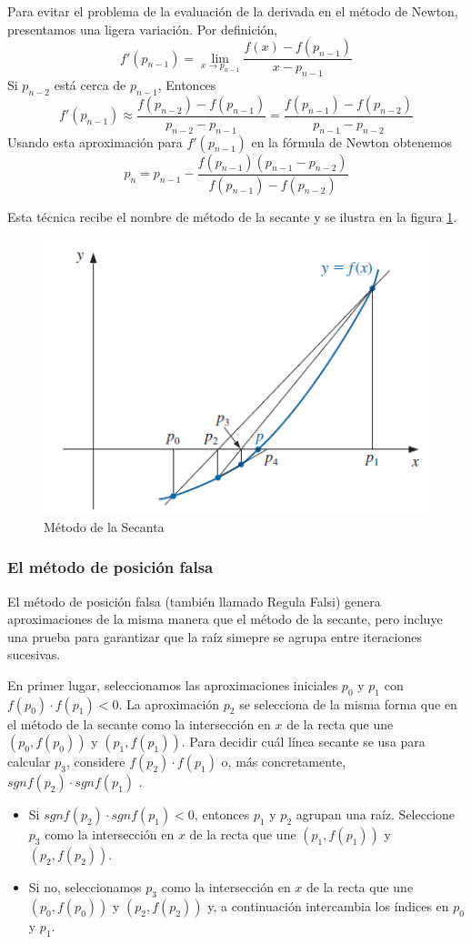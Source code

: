 Para evitar el problema de la evaluación de la derivada en el método de Newton, presentamos una ligera variación. Por definición,
\[ f'(p_{n - 1}) = \lim_{x \rightarrow p_{n - 1}} \frac{f(x) - f(p_{n  - 1})}{x - p_{n  - 1}} \]
Si $p_{n - 2}$ está cerca de $p_{n - 1}$, Entonces
\[ f'(p_{n - 1}) \approx \frac{f(p_{n - 2}) - f(p_{n - 1})}{p_{n - 2} - p_{n - 1}} = \frac{f(p_{n - 1}) - f(p_{n - 2})}{p_{n - 1} - p_{n - 2}}\]
Usando esta aproximación para $f'(p_{n - 1})$ en la fórmula de Newton obtenemos
\begin{equation}
    \label{eq: Metodo de la secante}
    p_n = p_{n  - 1} - \frac{f(p_{n - 1}) (p_{n - 1} - p_{n - 2})}{f(p_{n - 1}) - f(p_{n - 2})}
\end{equation}

Esta técnica recibe el nombre de método de la secante y se ilustra en la figura \ref{fig: Metodo de la Secante}.

\begin{figure}[h]
    \centering
    \includegraphics[width = 0.5 \textwidth]{Imagenes/6 - Metodo de la Secante.png}
    \caption{Método de la Secanta}
    \label{fig: Metodo de la Secante}
\end{figure}

\subsubsection{El método de posición falsa}

El método de posición falsa (también llamado Regula Falsi) genera aproximaciones de la misma manera que el método de la secante, pero incluye una prueba para garantizar que la raíz simepre se agrupa entre iteraciones sucesivas.

En primer lugar, seleccionamos las aproximaciones iniciales $p_0$ y $p_1$ con $f(p_0) \cdot f(p_1) < 0$. La aproximación $p_2$ se selecciona de la misma forma que en el método de la secante como la intersección en $x$ de la recta que une $(p_0, f(p_0))$ y $(p_1, f(p_1))$. Para decidir cuál línea secante se usa para calcular $p_3$, considere $f(p_2) \cdot f(p_1)$ o, más concretamente, $sgn f(p_2) \cdot sgn f(p_1)$ .
\begin{itemize}
    \item Si $sgn f(p_2) \cdot sgn f(p_1) < 0$, entonces $p_1$ y $p_2$ agrupan una raíz. Seleccione $p_3$ como la intersección en $x$ de la recta que une $(p_1, f(p_1))$ y $(p_2, f(p_2))$.
    \item Si no, seleccionamos $p_3$ como la intersección en $x$ de la recta que une $(p_0, f(p_0))$ y $(p_2, f(p_2))$ y, a continuación intercambia los índices en $p_0$ y $p_1$.
\end{itemize}

